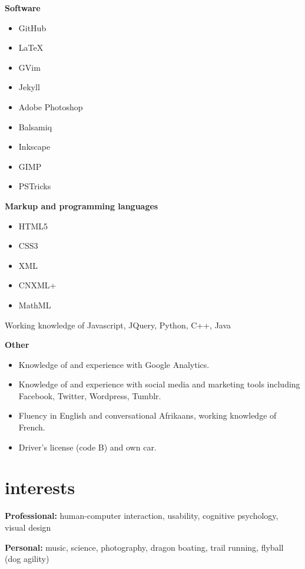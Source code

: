 \documentclass[]{friggeri-cv} %
\begin{document}
\textbf{Software}
\begin{multicols}{2}
\begin{itemize}
 \item GitHub
 \item LaTeX
 \item GVim
 \item Jekyll
  \item Adobe Photoshop
 \item Balsamiq
 \item Inkscape
 \item GIMP
 \item PSTricks
\end{itemize}
\end{multicols}

\textbf{Markup and programming languages}
\begin{itemize}
 \item HTML5
 \item CSS3
 \item XML
 \item CNXML+
 \item MathML
 \end{itemize}
Working knowledge of Javascript, JQuery, Python, C++, Java

\textbf{Other}
\begin{itemize}
 \item Knowledge of and experience with Google Analytics.
 \item Knowledge of and experience with social media and marketing tools including Facebook, Twitter, Wordpress, Tumblr.
 \item Fluency in English and conversational Afrikaans, working knowledge of French.
 \item Driver's license (code B) and own car.
\end{itemize}





\section{interests}

\textbf{Professional:} human-computer interaction, usability, cognitive psychology, visual design

\textbf{Personal:} music, science, photography, dragon boating, trail running, flyball (dog agility)
\end{document}
